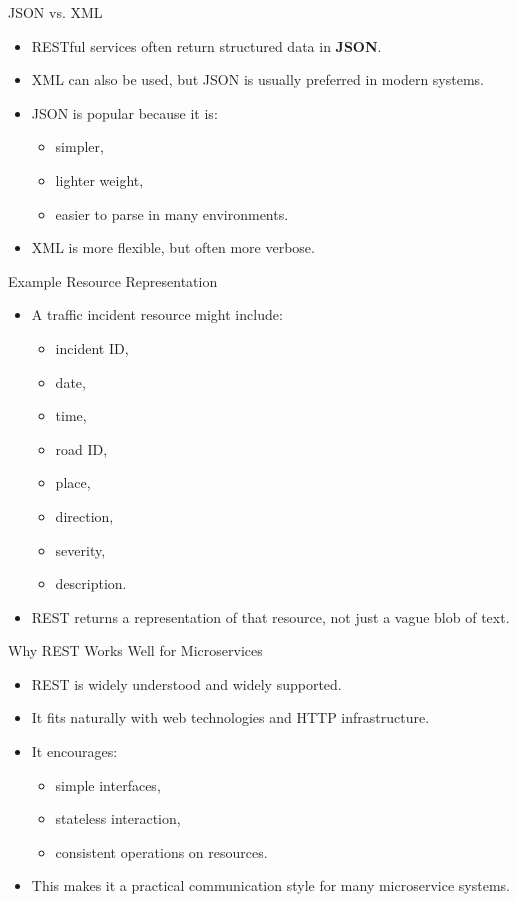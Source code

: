 \begin{frame}{JSON vs. XML}
\begin{itemize}
    \item RESTful services often return structured data in \textbf{JSON}.
    \item XML can also be used, but JSON is usually preferred in modern systems.
    \item JSON is popular because it is:
    \begin{itemize}
        \item simpler,
        \item lighter weight,
        \item easier to parse in many environments.
    \end{itemize}
    \item XML is more flexible, but often more verbose.
\end{itemize}
\end{frame}

\begin{frame}{Example Resource Representation}
\begin{itemize}
    \item A traffic incident resource might include:
    \begin{itemize}
        \item incident ID,
        \item date,
        \item time,
        \item road ID,
        \item place,
        \item direction,
        \item severity,
        \item description.
    \end{itemize}
    \item REST returns a representation of that resource, not just a vague blob of text.
\end{itemize}
\end{frame}

\begin{frame}{Why REST Works Well for Microservices}
\begin{itemize}
    \item REST is widely understood and widely supported.
    \item It fits naturally with web technologies and HTTP infrastructure.
    \item It encourages:
    \begin{itemize}
        \item simple interfaces,
        \item stateless interaction,
        \item consistent operations on resources.
    \end{itemize}
    \item This makes it a practical communication style for many microservice systems.
\end{itemize}
\end{frame}

